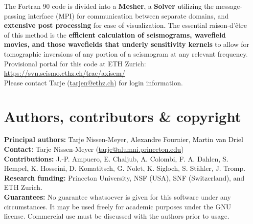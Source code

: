 \documentclass[11pt,letter,fleqn,english,notitlepage]{article}
\begin{document}
The Fortran 90 code is divided into a \textbf{Mesher}, a \textbf{Solver} utilizing the message-passing interface 
(MPI) for communication between separate domains, and
\textbf{extensive post processing} for ease of visualization.
The essential raison-d'\^{e}tre of this method is the \textbf{efficient calculation 
of seismograms, wavefield movies, and those wavefields that underly
sensitivity kernels} to allow for tomographic inversions of any portion of a seismogram at any relevant 
frequency. \\

\noindent Provisional portal for this code at ETH Zurich:
\url{https://svn.seismo.ethz.ch/trac/axisem/}\\
Please contact Tarje (\url{tarjen@ethz.ch}) for login information.

\section{Authors, contributors \& copyright}
%
\noindent \textbf{Principal authors:} Tarje Nissen-Meyer, Alexandre
Fournier, Martin van Driel\\
\noindent \textbf{Contact:} Tarje Nissen-Meyer (\url{tarje@alumni.princeton.edu})\\
\noindent \textbf{Contributions:}
 J.-P. Ampuero, E. Chaljub, A. Colombi, F. A. Dahlen, S. Hempel,
 K. Hosseini, D. Komatitsch,
 G. Nolet, K. Sigloch, S. St\"{a}hler, J. Tromp.\\
\noindent \textbf{Research funding:} Princeton University, NSF (USA), SNF (Switzerland), and 
ETH Zurich.\\
\noindent \textbf{Guarantees:} No guarantee whatsoever is given for this software under any circumstances. It may be used freely for 
academic purposes under the GNU license. Commercial use must be
discussed with the authors prior to usage.\\
\end{document}
